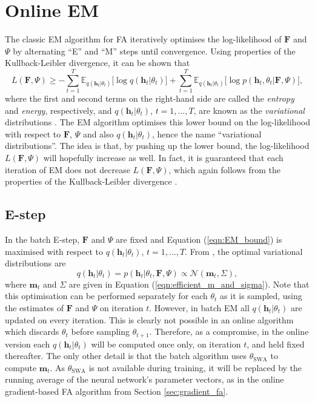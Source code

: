 \documentclass[msc,deptreport.inf]{infthesis} %
\newcommand{\matr}[1]{\mathbf{#1}}
\newcommand{\E}{\mathbb E}
\begin{document}
\section{Online EM}\label{sec:online_em}

The classic EM algorithm for FA iteratively optimises the log-likelihood of $\matr{F}$ and $\Psi$ by alternating ``E'' and ``M'' steps until convergence. Using properties of the Kullback-Leibler divergence, it can be shown that 
\begin{equation}\label{eqn:EM_bound}
	L(\matr{F}, \Psi) \geq 
	- \sum_{t=1}^T \E_{q(\matr{h}_t | \theta_t)} \big[\log q(\matr{h}_t | \theta_t)\big]
	+ \sum_{t=1}^T \E_{q(\matr{h}_t | \theta_t)} \big[\log p(\matr{h}_t, \theta_t | \matr{F}, \Psi)\big],
\end{equation}
where the first and second terms on the right-hand side are called the \emph{entropy} and \emph{energy}, respectively, and $q(\matr{h}_t | \theta_t)$, $t=1,\dots,T$, are known as the \emph{variational} distributions \cite{barber2007}. The EM algorithm optimises this lower bound on the log-likelihood with respect to $\matr{F}$, $\Psi$ and also $q(\matr{h}_t | \theta_t)$, hence the name ``variational distributions''. The idea is that, by pushing up the lower bound, the log-likelihood $L(\matr{F}, \Psi)$ will hopefully increase as well. In fact, it is guaranteed that each iteration of EM does not decrease $L(\matr{F}, \Psi)$, which again follows from the properties of the Kullback-Leibler divergence \cite{barber2007}.

\subsection{E-step}

In the batch E-step, $\matr{F}$ and $\Psi$ are fixed and Equation (\ref{eqn:EM_bound}) is maximised with respect to $q(\matr{h}_t | \theta_t)$, $t=1,\dots,T$. From \cite{barber2007}, the optimal variational distributions are 
\begin{equation}
	q(\matr{h}_t | \theta_t) = p(\matr{h}_t | \theta_t, \matr{F}, \Psi)  \propto \mathcal{N}(\matr{m}_t, \Sigma), 
\end{equation}
where $\matr{m}_t$ and $\Sigma$ are given in Equation (\ref{eqn:efficient_m_and_sigma}). Note that this optimisation can be performed separately for each $\theta_t$ as it is sampled, using the estimates of $\matr{F}$ and $\Psi$ on iteration $t$. However, in batch EM all $q(\matr{h}_t | \theta_t)$ are updated on every iteration. This is clearly not possible in an online algorithm which discards $\theta_t$ before sampling $\theta_{t + 1}$. Therefore, as a compromise, in the online version each $q(\matr{h}_t | \theta_t)$ will be computed once only, on iteration $t$, and held fixed thereafter. The only other detail is that the batch algorithm uses $\theta_{\text{SWA}}$ to compute $\matr{m}_t$. As $\theta_{\text{SWA}}$ is not available during training, it will be replaced by the running average of the neural network's parameter vectors, as in the online gradient-based FA algorithm from Section \ref{sec:gradient_fa}.
\end{document}
